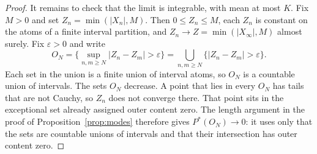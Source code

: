 \begin{proof}
It remains to check that the limit is integrable, with mean at most $K$. Fix $M>0$ and set $Z_n=\min(|X_n|,M)$. Then $0\le Z_n\le M$, each $Z_n$ is constant on the atoms of a finite interval partition, and $Z_n\to Z=\min(|X_\infty|,M)$ almost surely. Fix $\varepsilon>0$ and write
\[
 O_N=\bigl\{\sup_{n,m\ge N}|Z_n-Z_m|>\varepsilon\bigr\}=\bigcup_{n,m\ge N}\{|Z_n-Z_m|>\varepsilon\}.
\]
Each set in the union is a finite union of interval atoms, so $O_N$ is a countable union of intervals. The sets $O_N$ decrease. A point that lies in every $O_N$ has tails that are not Cauchy, so $Z_n$ does not converge there. That point sits in the exceptional set already assigned outer content zero. The length argument in the proof of Proposition~\ref{prop:modes} therefore gives $P^*(O_N)\to0$: it uses only that the sets are countable unions of intervals and that their intersection has outer content zero.


\end{proof}
